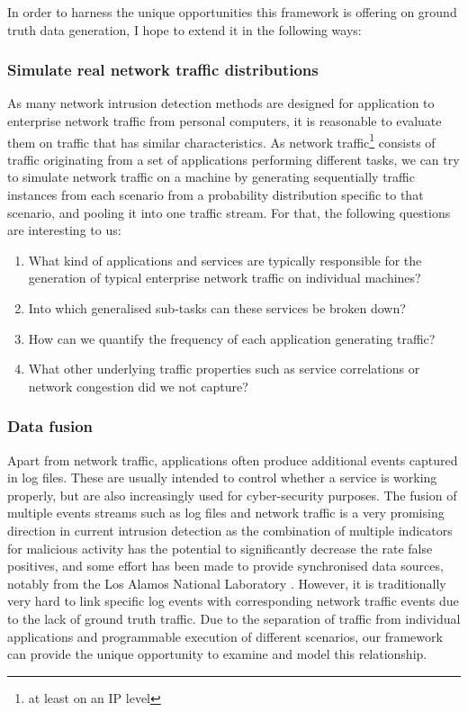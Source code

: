 \documentclass[a4paper,12pt,twoside]{report}
\begin{document}
In order to harness the unique opportunities this framework is offering on ground truth data generation, I hope to extend it in the following ways:

\subsubsection{Simulate real network traffic distributions}

As many network intrusion detection methods are designed for application to enterprise network traffic from personal computers, it is reasonable to evaluate them on traffic that has similar characteristics. As network traffic\footnote{at least on an IP level} consists of traffic originating from a set of applications performing different tasks, we can try to simulate network traffic on a machine by generating sequentially traffic instances from each scenario from a probability distribution specific to that scenario, and  pooling it into one traffic stream. For that, the following questions are interesting to us:
\begin{enumerate}
\item What kind of applications and services are typically responsible for the generation of typical enterprise network traffic on individual machines?
\item Into which generalised sub-tasks can these services be broken down?
\item How can we quantify the frequency of each application generating traffic?
\item What other underlying traffic properties such as service correlations or network congestion did we not capture?
\end{enumerate}

\subsubsection{Data fusion}\label{Fusion}

Apart from network traffic, applications often produce additional events captured in log files. These are usually intended to control whether a service is working properly, but are also increasingly used for cyber-security purposes. The fusion of multiple events streams such as log files and network traffic is a very promising direction in current intrusion detection as the combination of multiple indicators for malicious activity has the potential to significantly decrease the rate false positives, and some effort has been made to provide synchronised data sources, notably from the Los Alamos National Laboratory \cite{kent-2015-cyberdata1}. However, it is traditionally very hard to link specific log events with corresponding network traffic events due to the lack of ground truth traffic. Due to the separation of traffic from individual applications and programmable execution of different scenarios, our framework can provide the unique opportunity to examine and model this relationship. %
\end{document}
